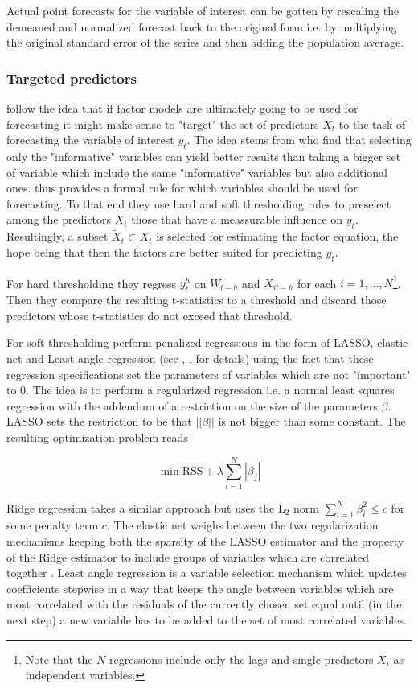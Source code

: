 \documentclass[12pt]{article}
\begin{document}
Actual point forecasts for the variable of interest can be gotten by rescaling the demeaned and normalized forecast back to the original form i.e. by multiplying the original standard error of the series and then adding the population average.

\subsubsection{Targeted predictors}
\citet{bai2008forecasting} follow the idea that if factor models are ultimately going to be used for forecasting it might make sense to "target" the set of predictors $X_t$ to the task of forecasting the variable of interest $y_t$. The idea stems from \citet{boivin2006more} who find that selecting only the "informative" variables can yield better results than taking a bigger set of variable which include the same "informative" variables but also additional ones. \citet{bai2008forecasting} thus provides a formal rule for which variables should be used for forecasting. To that end they use hard and soft thresholding rules to preselect among the predictors $X_t$ those that have a meassurable influence on $y_t$. Resultingly, a subset $\tilde X_t \subset X_t$ is selected for estimating the factor equation, the hope being that then the factors are better suited for predicting $y_t$.

For hard thresholding they regress $y_t^h$ on $W_{t-h}$ and $X_{it-h}$ for each $i=1, ..., N$\footnote{Note that the $N$ regressions include only the lags and single predictors $X_i$ as independent variables.}. Then they compare the resulting t-statistics to a threshold and discard those predictors whose t-statistics do not exceed that threshold. 

For soft thresholding \citet{bai2008forecasting} perform penalized regressions in the form of LASSO, elastic net and Least angle regression (see \citet{tibshirani1996}, \citet{zou_hastie2005}, \citet{efron_hastie_johnstone_tibshirani2004} for details) using the fact that these regression specifications set the parameters of variables which are not "important" to $0$. 
The idea is to perform a regularized regression i.e. a normal least squares regression with the addendum of a restriction on the size of the parameters $\beta$. LASSO sets the restriction to be that $||\beta||$ is not bigger than some constant. The resulting optimization problem reads

$$\min \text{RSS} + \lambda \sum_{i=1}^N |\beta_j|$$

Ridge regression takes a similar approach but uses the L$_2$ norm $\sum_{i=1}^N \beta_i^2 \leq c$ for some penalty term $c$. The elastic net weighs between the two regularization mechanisms keeping both the sparsity of the LASSO estimator and the property of the Ridge estimator to include groups of variables which are correlated together \citet{zou_hastie2005}. Least angle regression is a variable selection mechanism which updates coefficients stepwise in a way that keeps the angle between variables which are most correlated with the residuals of the currently chosen set equal until (in the next step) a new variable has to be added to the set of most correlated variables.
\end{document}
